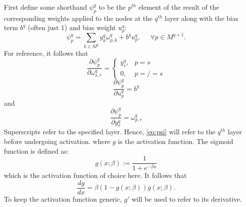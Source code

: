 \documentclass{article}
\begin{document}
First define some shorthand $\psi_p^q$ to be the $p^{th}$ element of the result of the corresponding weights applied to the nodes at the $q^{th}$ layer along with the bias term $b^q$ (often just 1) and bias weight $u_p^q$:
%
\begin{equation} \label{eq:psi}
\psi_p^q = \sum_{k \in M^q} y_k^q \omega_{p,k}^q + b^q u_p^q, \; \; \; \; \; \forall p \in M^{q+1}.
\end{equation}
%
For reference, it follows that
%
\begin{equation} \label{eq:dpsi_w}
\frac{\partial \psi_p^q}{\partial \omega_{s,r}^q} =
\begin{cases}
y_r^q, & p = s \\
0, & p =/= s
\end{cases}
\end{equation}
%
\begin{equation} \label{eq:dpsi_u}
\frac{\partial \psi_p^q}{\partial u_p^q} =
b^q
\end{equation}
%
and
%
\begin{equation} \label{eq:dpsi_y}
\frac{\partial \psi_p^q}{\partial y_r^q} =
\omega_{p,r}^q
\end{equation}
%
%
Superscripts refer to the specified layer.
Hence, \eqref{eq:psi} will refer to the $q^{th}$ layer before undergoing activation.
%
where $g$ is the activation function. The sigmoid function is defined as:
%
\begin{equation} \label{eq:g}
g(x;\beta) := \frac{1}{1 + e^{-\beta x}}
\end{equation}
%
which is the activation function of choice here.
It follows that
%
\begin{equation} \label{eq:gp}
\frac{d g}{d x} = \beta \left( 1 - g(x;\beta) \right) g(x; \beta).
\end{equation}
%
To keep the activation function generic, $g'$ will be used to refer to its derivative.
\end{document}
